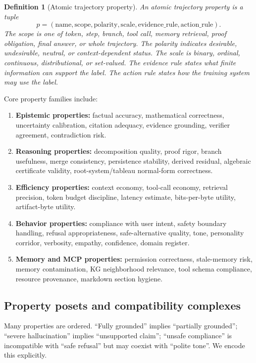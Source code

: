 \documentclass[11pt]{article}
\newtheorem{definition}[theorem]{Definition}
\numberwithin{equation}{section}
\begin{document}
\begin{definition}[Atomic trajectory property]
An atomic trajectory property is a tuple
\begin{equation}
p=(\mathrm{name},\mathrm{scope},\mathrm{polarity},\mathrm{scale},\mathrm{evidence\_rule},\mathrm{action\_rule}).
\end{equation}
The scope is one of token, step, branch, tool call, memory retrieval, proof obligation, final answer, or whole trajectory. The polarity indicates desirable, undesirable, neutral, or context-dependent status. The scale is binary, ordinal, continuous, distributional, or set-valued. The evidence rule states what finite information can support the label. The action rule states how the training system may use the label.
\end{definition}

Core property families include:
\begin{enumerate}
\item \textbf{Epistemic properties:} factual accuracy, mathematical correctness, uncertainty calibration, citation adequacy, evidence grounding, verifier agreement, contradiction risk.
\item \textbf{Reasoning properties:} decomposition quality, proof rigor, branch usefulness, merge consistency, persistence stability, derived residual, algebraic certificate validity, root-system/tableau normal-form correctness.
\item \textbf{Efficiency properties:} context economy, tool-call economy, retrieval precision, token budget discipline, latency estimate, bits-per-byte utility, artifact-byte utility.
\item \textbf{Behavior properties:} compliance with user intent, safety boundary handling, refusal appropriateness, safe-alternative quality, tone, personality corridor, verbosity, empathy, confidence, domain register.
\item \textbf{Memory and MCP properties:} permission correctness, stale-memory risk, memory contamination, KG neighborhood relevance, tool schema compliance, resource provenance, markdown section hygiene.
\end{enumerate}

\subsection{Property posets and compatibility complexes}
Many properties are ordered. ``Fully grounded'' implies ``partially grounded''; ``severe hallucination'' implies ``unsupported claim''; ``unsafe compliance'' is incompatible with ``safe refusal'' but may coexist with ``polite tone''. We encode this explicitly.
\end{document}
